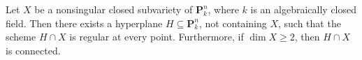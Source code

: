 Let $X$ be a nonsingular closed subvariety of $\mathbf{P}_k^n$, where $k$ is an algebraically closed field. Then there exists a hyperplane $H \subseteq \mathbf{P}_k^n$, not containing $X$, such that the scheme $H \cap X$ is regular at every point. Furthermore, if $\dim X \geqslant 2$, then $H \cap X$ is connected.
